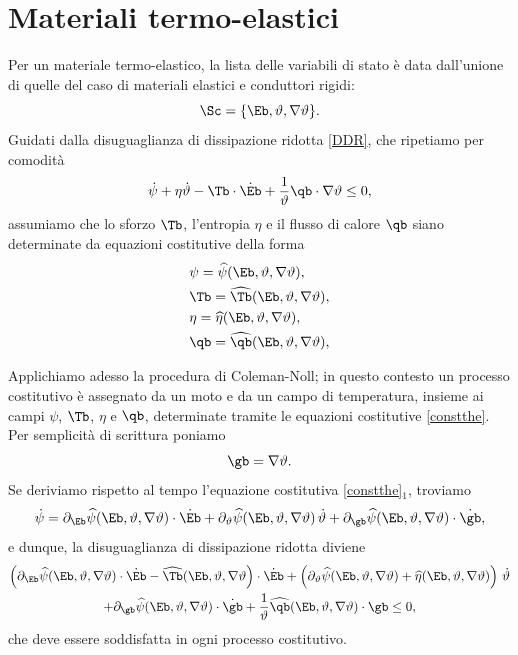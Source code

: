 \section{Materiali termo-elastici}
Per un materiale termo-elastico, la lista delle variabili di stato è data dall'unione di quelle del caso di materiali elastici e conduttori rigidi:
\begin{equation}
	\Sc= \{\Eb, \vartheta, \nabla\vartheta\}.
\end{equation}
Guidati dalla disuguaglianza di dissipazione ridotta \eqref{DDR}, che ripetiamo per comodità
\begin{equation}
	\dot{\psi}+\eta \dot{\vartheta}-\Tb\cdot\dot{\Eb}+\frac{1}{\vartheta}\qb \cdot \nabla \vartheta\leq 0,
\end{equation}
assumiamo che lo sforzo $\Tb$, l'entropia $\eta$ e il flusso di calore $\qb$ siano determinate da equazioni costitutive della forma
\begin{equation}\label{constthe}
\begin{aligned}
&\psi= \widehat{\psi}(\Eb, \vartheta, \nabla\vartheta),\\
&\Tb= \widehat{\Tb}(\Eb, \vartheta, \nabla\vartheta),\\
&\eta= \widehat{\eta}(\Eb, \vartheta, \nabla\vartheta),\\
&\qb= \widehat{\qb}(\Eb, \vartheta, \nabla\vartheta),\\
\end{aligned}
\end{equation}

Applichiamo adesso la procedura di Coleman-Noll; in questo contesto un processo costitutivo è assegnato da un moto e da un campo di temperatura, insieme ai campi $\psi$, $\Tb$, $\eta$ e $\qb$, determinate tramite le equazioni costitutive  \eqref{constthe}. 
Per semplicità di scrittura poniamo
\begin{equation}
\gb =\nabla \vartheta.
\end{equation}
 Se deriviamo rispetto al tempo l'equazione costitutiva \eqref{constthe}$_1$, troviamo 
 \begin{equation}\label{psidot}
 \dot\psi=\partial_\Eb \widehat{\psi}(\Eb, \vartheta, \nabla\vartheta)\cdot \dot \Eb+\partial_\vartheta\widehat{\psi}(\Eb, \vartheta, \nabla\vartheta)\,\dot \vartheta+\partial_\gb \widehat{\psi}(\Eb, \vartheta, \nabla\vartheta)\cdot \dot \gb,
 \end{equation}
e dunque, la disuguaglianza di dissipazione ridotta diviene
\begin{multline}\label{CNthe}
\left( \partial_\Eb \widehat{\psi}(\Eb, \vartheta, \nabla\vartheta)\cdot \dot \Eb- \widehat{\Tb}(\Eb, \vartheta, \nabla\vartheta \right)\cdot\dot \Eb+\left(  \partial_\vartheta\widehat{\psi}(\Eb, \vartheta, \nabla\vartheta)+\widehat{\eta}(\Eb, \vartheta, \nabla\vartheta) \right)\,\dot\vartheta\\+\partial_\gb \widehat{\psi}(\Eb, \vartheta, \nabla\vartheta)\cdot \dot \gb+\frac{1}{\vartheta} \widehat{\qb}(\Eb, \vartheta, \nabla\vartheta)\cdot \gb \leq 0, 
\end{multline}
che deve essere soddisfatta in ogni processo costitutivo.

